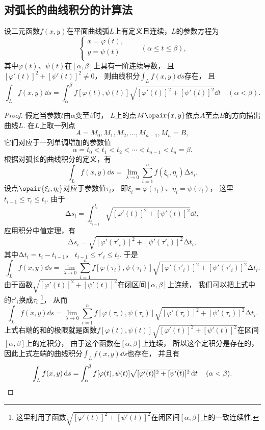 \subsection{对弧长的曲线积分的计算法}
\begin{theorem}
设二元函数\(f(x,y)\)在平面曲线弧\(L\)上有定义且连续，\(L\)的参数方程为\[
\left\{ \begin{array}{l}
x = \varphi(t), \\
y = \psi(t) \\
\end{array} \right.
\qquad
(\alpha \leq t \leq \beta),
\]其中\(\varphi(t)\)、\(\psi(t)\)在\([\alpha,\beta]\)上具有一阶连续导数，
且\([\varphi'(t)]^2+[\psi'(t)]^2 \neq 0\)，
则曲线积分\(\int_L f(x,y) \dd{s}\)存在，
且\begin{equation}\label{equation:线积分与面积分.第一类曲线积分的计算式1}
\int_L f(x,y) \dd{s}
= \int_{\alpha}^{\beta} f[\varphi(t),\psi(t)] \sqrt{[\varphi'(t)]^2+[\psi'(t)]^2} \dd{t}
\quad(\alpha<\beta).
\end{equation}
\begin{proof}
假定当参数\(t\)由\(\alpha\)变至\(\beta\)时，
\(L\)上的点\(M\opair{x,y}\)依点\(A\)至点\(B\)的方向描出曲线\(L\).
在\(L\)上取一列点\[
A=M_0,M_1,M_2,\dotsc,M_{n-1},M_n=B,
\]它们对应于一列单调增加的参数值\[
\alpha=t_0<t_1<t_2<\dotsb<t_{n-1}<t_n=\beta.
\]根据对弧长的曲线积分的定义，有\[
\int_L f(x,y) \dd{s} = \lim\limits_{\lambda\to0} \sum\limits_{i=1}^n f(\xi_i,\eta_i) \increment s_i.
\]设点\(\opair{\xi_i,\eta_i}\)对应于参数值\(\tau_i\)，
即\(\xi_i=\varphi(\tau_i)\)、\(\eta_i=\psi(\tau_i)\)，
这里\(t_{i-1}\leq\tau_i\leq t_i\).
由于\[
\increment s_i = \int_{t_{i-1}}^{t_i} \sqrt{[\varphi'(t)]^2+[\psi'(t)]^2} \dd{t},
\]应用积分中值定理，有\[
\increment s_i = \sqrt{[\varphi'(\tau'_i)]^2+[\psi'(\tau'_i)]^2} \increment t_i,
\]其中\(\increment t_i = t_i - t_{i-1}\)，
\(t_{i-1} \leq \tau'_i \leq t_i\).
于是\[
\int_L f(x,y) \dd{s}
= \lim\limits_{\lambda\to0} \sum\limits_{i=1}^n f[\varphi(\tau_i),\psi(\tau_i)] \sqrt{[\varphi'(\tau'_i)]^2+[\psi'(\tau'_i)]^2} \increment t_i.
\]由于函数\(\sqrt{[\varphi'(t)]^2+[\psi'(t)]^2}\)在闭区间\([\alpha,\beta]\)上连续，
我们可以把上式中的\(\tau'_i\)换成\(\tau_i\)
\footnote{这里利用了函数\(\sqrt{[\varphi'(t)]^2+[\psi'(t)]^2}\)在闭区间\([\alpha,\beta]\)上的一致连续性.}，
从而\[
\int_L f(x,y) \dd{s}
= \lim\limits_{\lambda\to0} \sum\limits_{i=1}^n f[\varphi(\tau_i),\psi(\tau_i)] \sqrt{[\varphi'(\tau_i)]^2+[\psi'(\tau_i)]^2} \increment t_i.
\]上式右端的和的极限就是函数\(f[\varphi(t),\psi(t)] \sqrt{[\varphi'(t)]^2+[\psi'(t)]^2}\)在区间\([\alpha,\beta]\)上的定积分，
由于这个函数在\([\alpha,\beta]\)上连续，
所以这个定积分是存在的，
因此上式左端的曲线积分\(\int_L f(x,y) \dd{s}\)也存在，
并且有\[
\int_L f(x,y) \dd{s}
=\int_{\alpha}^{\beta}
 f[\varphi(t),\psi(t)]
 \sqrt{[\varphi'(t)]^2+[\psi'(t)]^2}
 \dd{t}
\quad(\alpha<\beta).
\qedhere
\]
\end{proof}
\end{theorem}
